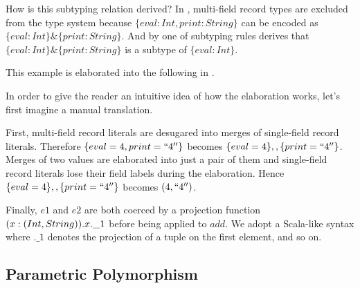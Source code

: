 How is this subtyping relation derived? In \FIend, multi-field record types are
excluded from the type system because $ \{ eval : Int, print : String \} $ can
be encoded as $ \{ eval : Int \} \& \{ print : String \} $. And by one of
subtyping rules derives that $ \{ eval : Int \} \& \{ print : String \} $ is a
subtype of $ \{ eval : Int \} $.

This example is elaborated into the following in \Fend.


In order to give the reader an intuitive idea of how the elaboration works,
let's first imagine a manual translation.

First, multi-field record literals are desugared into merges of single-field
record literals. Therefore $ \{ eval = 4, print = ``4'' \} $ becomes
$ \{ eval = 4 \} ,, \{ print = ``4'' \} $. Merges of two values are elaborated
into just a pair of them and single-field record literals lose their field
labels during the elaboration. Hence $ \{ eval = 4 \} ,, \{ print = ``4'' \} $
becomes $ (4, ``4'') $.

Finally, $ e1 $ and $ e2 $ are both coerced by a projection function
$ \\(x:(Int,String)). x.\_1 $ before being applied to $ add $. We adopt a
Scala-like syntax where $ .\_1 $ denotes the projection of a tuple on the first
element, and so on.

\subsection{Parametric Polymorphism}
